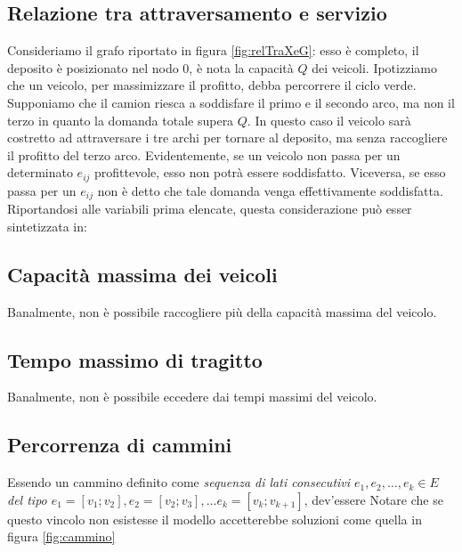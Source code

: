 \subsection{Relazione tra attraversamento e servizio}
	Consideriamo il grafo riportato in figura \ref{fig:relTraXeG}: esso è completo, il deposito è posizionato nel nodo 0, è nota
	la capacità $Q$ dei veicoli. Ipotizziamo che un veicolo, per massimizzare il profitto, debba percorrere il ciclo verde.\\
	Supponiamo che il camion riesca a soddisfare il primo e il secondo arco, ma non il terzo in quanto la domanda totale supera $Q$. 
	In questo caso il veicolo sarà costretto ad attraversare i tre archi per tornare al deposito, ma senza raccogliere il profitto del terzo arco.
	Evidentemente, se un veicolo non passa per un determinato $e_{ij}$ profittevole, esso non potrà essere soddisfatto. Viceversa, se
	esso passa per un $e_{ij}$ non è detto che tale domanda venga effettivamente soddisfatta.
	Riportandosi alle variabili prima elencate, questa considerazione può esser sintetizzata in:
\subsection{Capacità massima dei veicoli}
	Banalmente, non è possibile raccogliere più della capacità massima del veicolo.
\subsection{Tempo massimo di tragitto}
	Banalmente, non è possibile eccedere dai tempi massimi del veicolo.
\subsection{Percorrenza di cammini}
	Essendo un cammino definito come \emph{sequenza di lati consecutivi $e_1,e_2,\ldots,e_k 
	           \in E$ del tipo $e_1 = [v_1;v_2], e_2=[v_2;v_3],\ldots e_k=[v_k;v_{k+1}]$}, dev'essere
	Notare che se questo vincolo non esistesse il modello accetterebbe soluzioni come quella in figura \ref{fig:cammino}
